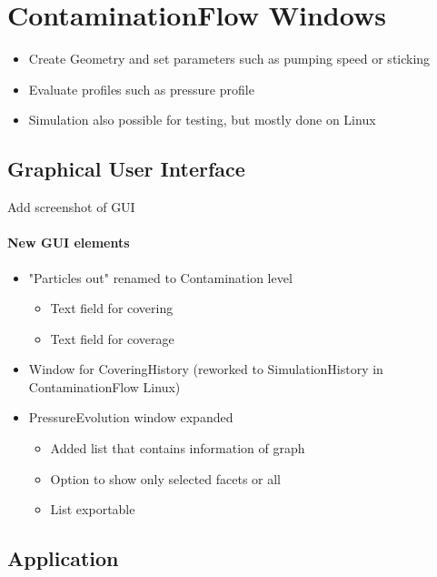 
\chapter{ContaminationFlow Windows}\label{chapter:Windows}

\begin{itemize}[noitemsep,topsep=0pt]
\item Create Geometry and set parameters such as pumping speed or sticking
\item Evaluate profiles such as pressure profile
\item Simulation also possible for testing, but mostly done on Linux
\end{itemize}

\section{Graphical User Interface}
Add screenshot of GUI

\subsubsection{New GUI elements}
\begin{itemize}[noitemsep,topsep=0pt]
\item "Particles out" renamed to Contamination level
\begin{itemize}
\item Text field for covering
\item Text field for coverage
\end{itemize}
\item Window for CoveringHistory (reworked to SimulationHistory in ContaminationFlow Linux)
\item PressureEvolution window expanded
	\begin{itemize}[noitemsep,topsep=0pt]
	\item Added list that contains information of graph
	\item Option to show only selected facets or all
	\item List exportable
	\end{itemize}
\end{itemize}

\section{Application}
